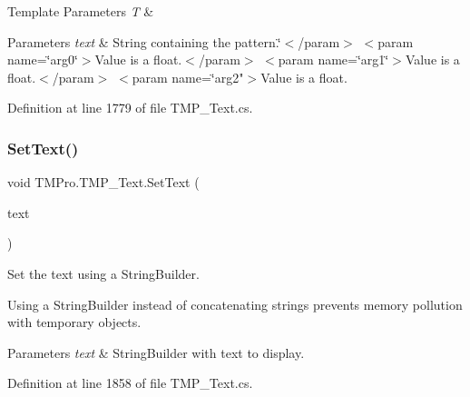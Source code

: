 \begin{DoxyTemplParams}{Template Parameters}
{\em T} & \\
\hline
\end{DoxyTemplParams}

\begin{DoxyParams}{Parameters}
{\em text} & String containing the pattern.\char`\"{}$<$/param$>$
$<$param name=\char`\"{}arg0\char`\"{}$>$\+Value is a float.$<$/param$>$
$<$param name=\char`\"{}arg1\char`\"{}$>$\+Value is a float.$<$/param$>$
$<$param name=\char`\"{}arg2"$>$Value is a float.\\
\hline
\end{DoxyParams}


Definition at line 1779 of file T\+M\+P\+\_\+\+Text.\+cs.

\mbox{\label{class_t_m_pro_1_1_t_m_p___text_a1dcc7f267313604b2f59cb5f2e46d7e8}} 
\subsubsection{\texorpdfstring{SetText()}{SetText()}\hspace{0.1cm}{\footnotesize\ttfamily [6/6]}}
{\footnotesize\ttfamily void T\+M\+Pro.\+T\+M\+P\+\_\+\+Text.\+Set\+Text (\begin{DoxyParamCaption}\item[{String\+Builder}]{text }\end{DoxyParamCaption})}



Set the text using a String\+Builder. 

Using a String\+Builder instead of concatenating strings prevents memory pollution with temporary objects.  
\begin{DoxyParams}{Parameters}
{\em text} & String\+Builder with text to display.\\
\hline
\end{DoxyParams}


Definition at line 1858 of file T\+M\+P\+\_\+\+Text.\+cs.

\mbox{\label{class_t_m_pro_1_1_t_m_p___text_a6405a9fd3c1d9ec929b50a6e070673ad}} 
